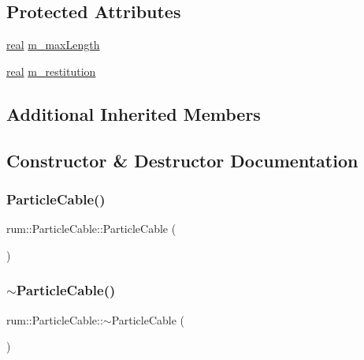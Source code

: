 \subsection*{Protected Attributes}
\begin{DoxyCompactItemize}
\item 
\hyperlink{namespacerum_a7e8cca23573d5eaead0f138cbaa4862c}{real} \hyperlink{classrum_1_1_particle_cable_a7232daf25d24eff2f98e03918bfbfb7c}{m\+\_\+max\+Length}
\item 
\hyperlink{namespacerum_a7e8cca23573d5eaead0f138cbaa4862c}{real} \hyperlink{classrum_1_1_particle_cable_affbb776b02c85a36d0d0bb1ca6f4234a}{m\+\_\+restitution}
\end{DoxyCompactItemize}
\subsection*{Additional Inherited Members}


\subsection{Constructor \& Destructor Documentation}
\mbox{\label{classrum_1_1_particle_cable_ad2b529c1d51b6af9f3c2e7f535e64c0c}} 
\subsubsection{\texorpdfstring{Particle\+Cable()}{ParticleCable()}}
{\footnotesize\ttfamily rum\+::\+Particle\+Cable\+::\+Particle\+Cable (\begin{DoxyParamCaption}{ }\end{DoxyParamCaption})\hspace{0.3cm}{\ttfamily [explicit]}}

\mbox{\label{classrum_1_1_particle_cable_aac2552bf3ddefc5c59fd7953a719b43a}} 
\subsubsection{\texorpdfstring{$\sim$\+Particle\+Cable()}{~ParticleCable()}}
{\footnotesize\ttfamily rum\+::\+Particle\+Cable\+::$\sim$\+Particle\+Cable (\begin{DoxyParamCaption}{ }\end{DoxyParamCaption})}



